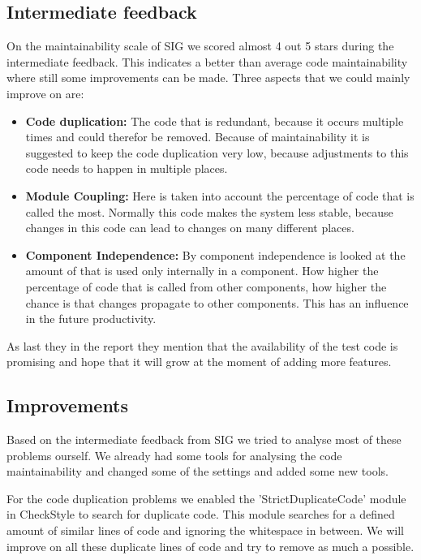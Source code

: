\subsection{Intermediate feedback}
On the maintainability scale of SIG we scored almost 4 out 5 stars during the intermediate feedback.
This indicates a better than average code maintainability where still some improvements can be made.
Three aspects that we could mainly improve on are:

\begin{itemize}
\item \textbf{Code duplication:} The code that is redundant, because it occurs multiple times and could therefor be removed. 
Because of maintainability it is suggested to keep the code duplication very low, because adjustments to this code needs to happen in multiple places.
\item \textbf{Module Coupling:} Here is taken into account the percentage of code that is called the most.
Normally this code makes the system less stable, because changes in this code can lead to changes on many different places.
\item \textbf{Component Independence:} By component independence is looked at the amount of that is used only internally in a component.
How higher the percentage of code that is called from other components, how higher the chance is that changes propagate to other components.
This has an influence in the future productivity.
\end{itemize}

As last they in the report they mention that the availability of the test code is promising and hope that it will grow at the moment of adding more features.

\subsection{Improvements}
Based on the intermediate feedback from SIG we tried to analyse most of these problems ourself.
We already had some tools for analysing the code maintainability and changed some of the settings and added some new tools.

For the code duplication problems we enabled the 'StrictDuplicateCode' module in CheckStyle to search for duplicate code.
This module searches for a defined amount of similar lines of code and ignoring the whitespace in between.
We will improve on all these duplicate lines of code and try to remove as much a possible.

